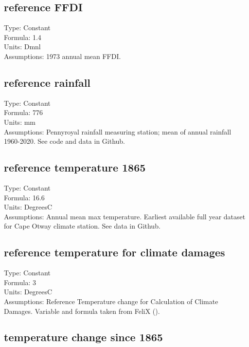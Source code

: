 \documentclass[
  11pt,
]{book}
\begin{document}
\hypertarget{reference-ffdi}{%
\subsection{reference FFDI}\label{reference-ffdi}}

Type: Constant\\
Formula: 1.4\\
Units: Dmnl\\
Assumptions: 1973 annual mean FFDI.

\hypertarget{reference-rainfall}{%
\subsection{reference rainfall}\label{reference-rainfall}}

Type: Constant\\
Formula: 776\\
Units: mm\\
Assumptions: Pennyroyal rainfall measuring station; mean of annual rainfall 1960-2020. See code and data in Github.

\hypertarget{reference-temperature-1865}{%
\subsection{reference temperature 1865}\label{reference-temperature-1865}}

Type: Constant\\
Formula: 16.6\\
Units: DegreesC\\
Assumptions: Annual mean max temperature. Earliest available full year dataset for Cape Otway climate station. See data in Github.

\hypertarget{reference-temperature-for-climate-damages}{%
\subsection{reference temperature for climate damages}\label{reference-temperature-for-climate-damages}}

Type: Constant\\
Formula: 3\\
Units: DegreesC\\
Assumptions: Reference Temperature change for Calculation of Climate Damages. Variable and formula taken from FeliX (\citet{rydzak_impact_2010}).

\hypertarget{temperature-change-since-1865}{%
\subsection{temperature change since 1865}\label{temperature-change-since-1865}}
\end{document}
